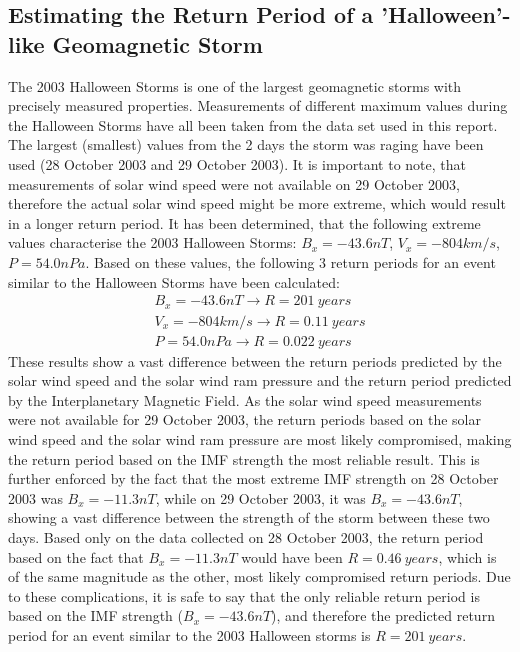 \documentclass[12pt]{article}
\begin{document}
    \subsection{Estimating the Return Period of a 'Halloween'-like Geomagnetic Storm}\label{sec:halloween}
        The 2003 Halloween Storms is one of the largest geomagnetic storms with precisely measured properties. Measurements of different maximum values during the Halloween Storms have all been taken from the data set used in this report. The largest (smallest) values from the 2 days the storm was raging have been used (28 October 2003 and 29 October 2003). It is important to note, that measurements of solar wind speed were not available on 29 October 2003, therefore the actual solar wind speed might be more extreme, which would result in a longer return period. It has been determined, that the following extreme values characterise the 2003 Halloween Storms: $B_x=-43.6nT$, $V_x=-804km/s$, $P=54.0nPa$. Based on these values, the following 3 return periods for an event similar to the Halloween Storms have been calculated:
        \begin{equation}
            \begin{split}
                B_x=-43.6nT\rightarrow R=201\ years\\
                V_x=-804km/s\rightarrow R=0.11\ years\\
                P=54.0nPa\rightarrow R=0.022\ years
            \end{split}
        \end{equation}
        These results show a vast difference between the return periods predicted by the solar wind speed and the solar wind ram pressure and the return period predicted by the Interplanetary Magnetic Field. As the solar wind speed measurements were not available for 29 October 2003, the return periods based on the solar wind speed and the solar wind ram pressure are most likely compromised, making the return period based on the IMF strength the most reliable result. This is further enforced by the fact that the most extreme IMF strength on 28 October 2003 was $B_x=-11.3nT$, while on 29 October 2003, it was $B_x=-43.6nT$, showing a vast difference between the strength of the storm between these two days. Based only on the data collected on 28 October 2003, the return period based on the fact that $B_x=-11.3nT$ would have been $R=0.46\ years$, which is of the same magnitude as the other, most likely compromised return periods. Due to these complications, it is safe to say that the only reliable return period is based on the IMF strength ($B_x=-43.6nT$), and therefore the predicted return period for an event similar to the 2003 Halloween storms is $R=201\ years$.
\end{document}
